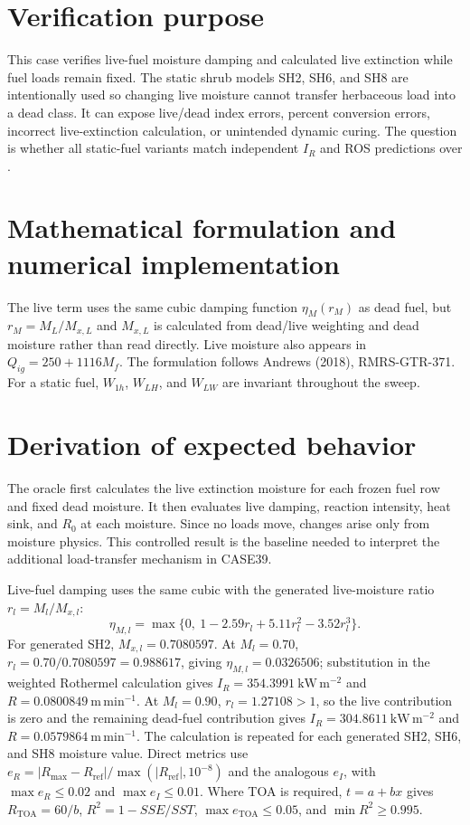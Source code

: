 \section{Verification purpose}
This case verifies live-fuel moisture damping and calculated live extinction while fuel loads remain fixed.  The static shrub models SH2, SH6, and SH8 are intentionally used so changing live moisture cannot transfer herbaceous load into a dead class.  It can expose live/dead index errors, percent conversion errors, incorrect live-extinction calculation, or unintended dynamic curing.  The question is whether all static-fuel variants match independent $I_R$ and ROS predictions over \LiveMoistureSet{}.

\section{Mathematical formulation and numerical implementation}
The live term uses the same cubic damping function $\eta_M(r_M)$ as dead fuel, but $r_M=M_L/M_{x,L}$ and $M_{x,L}$ is calculated from dead/live weighting and dead moisture rather than read directly.  Live moisture also appears in $Q_{ig}=250+1116M_f$.  The formulation follows Andrews (2018), RMRS-GTR-371.  For a static fuel, $W_{1h}$, $W_{LH}$, and $W_{LW}$ are invariant throughout the sweep.

\section{Derivation of expected behavior}
The oracle first calculates the live extinction moisture for each frozen fuel row and fixed dead moisture.  It then evaluates live damping, reaction intensity, heat sink, and $R_0$ at each moisture.  Since no loads move, changes arise only from moisture physics.  This controlled result is the baseline needed to interpret the additional load-transfer mechanism in CASE39.

Live-fuel damping uses the same cubic with the generated live-moisture
ratio \(r_l=M_l/M_{x,l}\):
\[
 \eta_{M,l}=\max\{0,\ 1-2.59r_l+5.11r_l^2-3.52r_l^3\}.
\]
For generated SH2, \(M_{x,l}=0.7080597\).  At \(M_l=0.70\),
\(r_l=0.70/0.7080597=0.988617\), giving
\(\eta_{M,l}=0.0326506\); substitution in the weighted Rothermel
calculation gives \(I_R=354.3991~\mathrm{kW\,m^{-2}}\) and
\(R=0.0800849~\mathrm{m\,min^{-1}}\).  At \(M_l=0.90\),
\(r_l=1.27108>1\), so the live contribution is zero and the remaining
dead-fuel contribution gives \(I_R=304.8611~\mathrm{kW\,m^{-2}}\) and
\(R=0.0579864~\mathrm{m\,min^{-1}}\).
The calculation is repeated for each generated SH2, SH6, and SH8 moisture
value.  Direct metrics use
\(e_R=|R_{\max}-R_{\mathrm{ref}}|/
\max(|R_{\mathrm{ref}}|,10^{-8})\) and the analogous \(e_I\), with
\(\max e_R\leq0.02\) and \(\max e_I\leq0.01\).
Where TOA is required, \(t=a+bx\) gives
\(R_{\mathrm{TOA}}=60/b\), \(R^2=1-SSE/SST\),
\(\max e_{\mathrm{TOA}}\leq0.05\), and \(\min R^2\geq0.995\).

